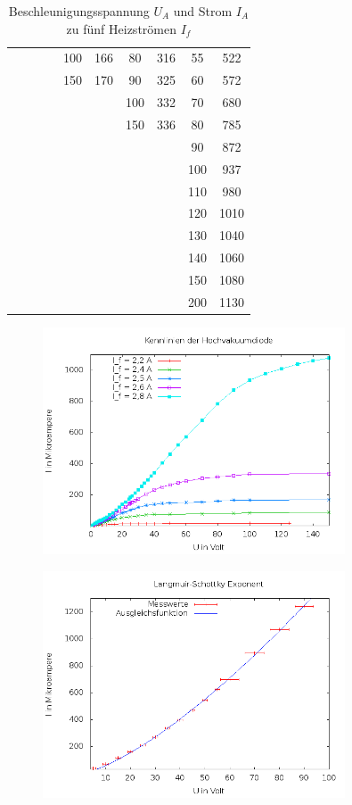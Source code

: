 \begin{table}[H]
\begin{tabular}{|c|c||c|c||c|c||c|c||c|c|}
	&&		&&	100&	166&	80&	316&	55&	522\\
	&&		&&	150&	170&	90&	325&	60&	572\\
	&&		&&		&&	100&	332&	70&	680\\
	&&		&&		&&	150&	336&	80&	785\\
	&&		&&		&&		&&	90&	872\\
	&&		&&		&&		&&	100&	937\\
	&&		&&		&&		&&	110&	980\\
	&&		&&		&&		&&	120&	1010\\
	&&		&&		&&		&&	130&	1040\\
	&&		&&		&&		&&	140&	1060\\
	&&		&&		&&		&&	150&	1080\\
	&&		&&		&&		&&	200&	1130 \\
\hline
\end{tabular}
\label{tabheiz}
\caption{Beschleunigungsspannung $U_A$ und Strom $I_A$ zu fünf Heizströmen $I_f$}
\end{table}



\begin{figure}[H]
\includegraphics[width=0.8\textwidth]{pics/504a.png}
\end{figure}

\begin{figure}[H]
\includegraphics[width=0.8\textwidth]{pics/504b1.png}
\end{figure}

